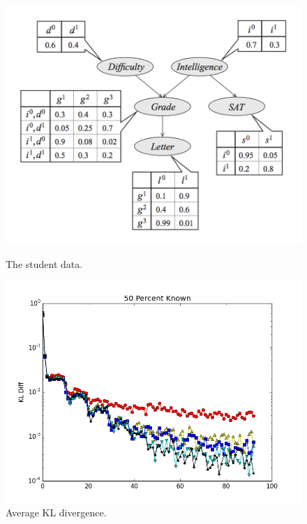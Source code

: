 \documentclass{article} %
\begin{document}
\begin{figure}[t]
  \centering
  \begin{minipage}{.46\textwidth}
    \centering
    \includegraphics[width=1\textwidth]{fig_student_diagram}
    \caption{The student data.}
    \label{fig:student_diagram}
  \end{minipage}\hfill
    \begin{minipage}{.5\textwidth}
    \centering
    \includegraphics[width=1\textwidth]{fig_kl_student_50perc}
    \caption{Average KL divergence.}
    \label{fig:kl_accuracy}
  \end{minipage}
\end{figure}
\end{document}
